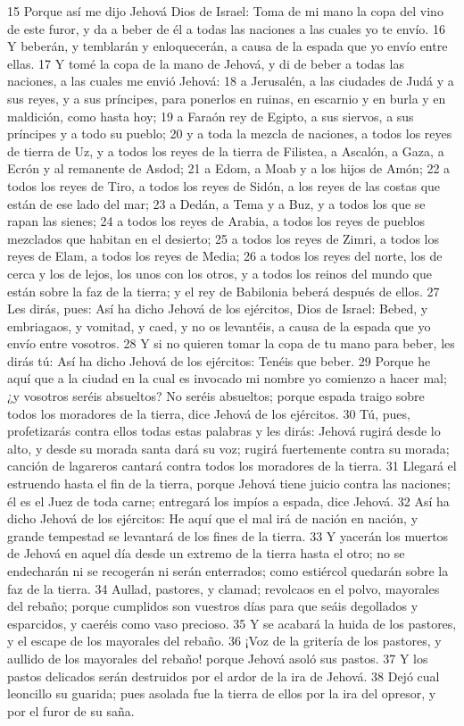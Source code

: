 15 Porque así me dijo Jehová Dios de Israel: Toma de mi mano la copa del vino de este furor, y da a beber de él a todas las naciones a las cuales yo te envío.
16 Y beberán, y temblarán y enloquecerán, a causa de la espada que yo envío entre ellas.
17 Y tomé la copa de la mano de Jehová, y di de beber a todas las naciones, a las cuales me envió Jehová:
18 a Jerusalén, a las ciudades de Judá y a sus reyes, y a sus príncipes, para ponerlos en ruinas, en escarnio y en burla y en maldición, como hasta hoy;
19 a Faraón rey de Egipto, a sus siervos, a sus príncipes y a todo su pueblo;
20 y a toda la mezcla de naciones, a todos los reyes de tierra de Uz, y a todos los reyes de la tierra de Filistea, a Ascalón, a Gaza, a Ecrón y al remanente de Asdod;
21 a Edom, a Moab y a los hijos de Amón;
22 a todos los reyes de Tiro, a todos los reyes de Sidón, a los reyes de las costas que están de ese lado del mar;
23 a Dedán, a Tema y a Buz, y a todos los que se rapan las sienes;
24 a todos los reyes de Arabia, a todos los reyes de pueblos mezclados que habitan en el desierto;
25 a todos los reyes de Zimri, a todos los reyes de Elam, a todos los reyes de Media;
26 a todos los reyes del norte, los de cerca y los de lejos, los unos con los otros, y a todos los reinos del mundo que están sobre la faz de la tierra; y el rey de Babilonia beberá después de ellos.
27 Les dirás, pues: Así ha dicho Jehová de los ejércitos, Dios de Israel: Bebed, y embriagaos, y vomitad, y caed, y no os levantéis, a causa de la espada que yo envío entre vosotros.
28 Y si no quieren tomar la copa de tu mano para beber, les dirás tú: Así ha dicho Jehová de los ejércitos: Tenéis que beber.
29 Porque he aquí que a la ciudad en la cual es invocado mi nombre yo comienzo a hacer mal; ¿y vosotros seréis absueltos? No seréis absueltos; porque espada traigo sobre todos los moradores de la tierra, dice Jehová de los ejércitos.
30 Tú, pues, profetizarás contra ellos todas estas palabras y les dirás: Jehová rugirá desde lo alto, y desde su morada santa dará su voz; rugirá fuertemente contra su morada; canción de lagareros cantará contra todos los moradores de la tierra.
31 Llegará el estruendo hasta el fin de la tierra, porque Jehová tiene juicio contra las naciones; él es el Juez de toda carne; entregará los impíos a espada, dice Jehová.
32 Así ha dicho Jehová de los ejércitos: He aquí que el mal irá de nación en nación, y grande tempestad se levantará de los fines de la tierra.
33 Y yacerán los muertos de Jehová en aquel día desde un extremo de la tierra hasta el otro; no se endecharán ni se recogerán ni serán enterrados; como estiércol quedarán sobre la faz de la tierra.
34 Aullad, pastores, y clamad; revolcaos en el polvo, mayorales del rebaño; porque cumplidos son vuestros días para que seáis degollados y esparcidos, y caeréis como vaso precioso.
35 Y se acabará la huida de los pastores, y el escape de los mayorales del rebaño. 
36 ¡Voz de la gritería de los pastores, y aullido de los mayorales del rebaño! porque Jehová asoló sus pastos.
37 Y los pastos delicados serán destruidos por el ardor de la ira de Jehová.
38 Dejó cual leoncillo su guarida; pues asolada fue la tierra de ellos por la ira del opresor, y por el furor de su saña.

